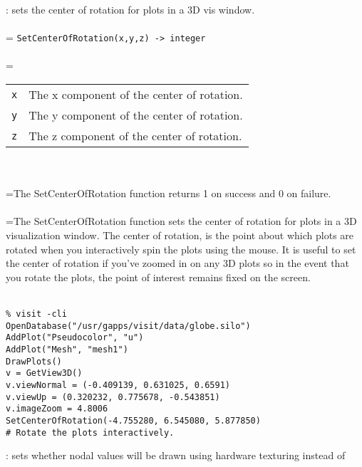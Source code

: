 \documentclass[10pt,a4paper]{report}
\begin{document}
{}
: sets the center of rotation for plots in a 3D vis window.\\[-3mm]

 \\ 
\hangindent=\parindent 
\verb!SetCenterOfRotation(x,y,z) -> integer!\\ [-3mm]

 \\ 
\hangindent=\parindent 
\begin{tabular}{lp{9cm}}
\verb!x! & The x component of the center of rotation. \\
\verb!y! & The y component of the center of rotation. \\
\verb!z! & The z component of the center of rotation. \\
\end{tabular} \\[-2mm]


 \\ 
\hangindent=\parindent The SetCenterOfRotation function returns 1 on success and 0 on failure. \\[-3mm] 

 \\ 
\hangindent=\parindent The SetCenterOfRotation function sets the center of rotation for plots in a 3D visualization window. The center of rotation, is the point about which plots are rotated when you interactively spin the plots using the mouse. It is useful to set the center of rotation if you've zoomed in on any 3D plots so in the event that you rotate the plots, the point of interest remains fixed on the screen. \\[-3mm] 

\\[-6mm]
\begin{verbatim}% visit -cli
OpenDatabase("/usr/gapps/visit/data/globe.silo")
AddPlot("Pseudocolor", "u")
AddPlot("Mesh", "mesh1")
DrawPlots()
v = GetView3D()
v.viewNormal = (-0.409139, 0.631025, 0.6591)
v.viewUp = (0.320232, 0.775678, -0.543851)
v.imageZoom = 4.8006
SetCenterOfRotation(-4.755280, 6.545080, 5.877850)
# Rotate the plots interactively.
\end{verbatim}
\newpage


{}
: sets whether nodal values will be drawn using hardware texturing instead of\\[-3mm]
\end{document}
